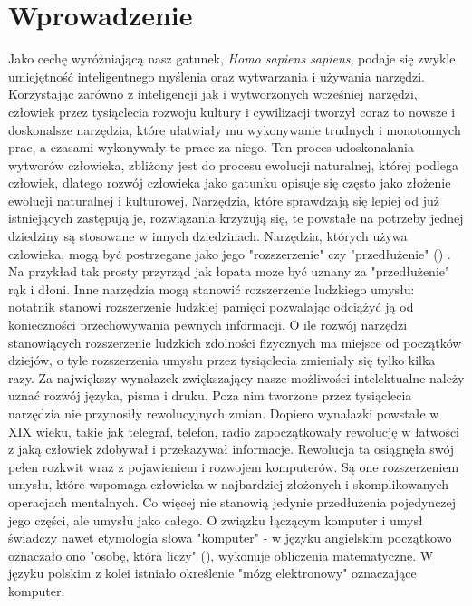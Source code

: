 \chapter{Wprowadzenie}
Jako cechę wyróżniającą nasz gatunek, \textit{Homo sapiens sapiens},  podaje się zwykle umiejętność inteligentnego myślenia oraz wytwarzania i używania narzędzi. Korzystając zarówno z inteligencji jak i wytworzonych wcześniej narzędzi, człowiek przez tysiąclecia rozwoju kultury i cywilizacji tworzył coraz to nowsze i doskonalsze narzędzia, które ułatwiały mu wykonywanie trudnych i monotonnych prac, a czasami wykonywały te prace za niego. Ten proces udoskonalania wytworów człowieka, zbliżony jest do procesu ewolucji naturalnej, której podlega człowiek, dlatego rozwój człowieka jako gatunku opisuje się często jako złożenie ewolucji naturalnej i kulturowej. Narzędzia, które sprawdzają się lepiej od już istniejących zastępują je, rozwiązania krzyżują się, te powstałe na potrzeby jednej dziedziny są stosowane w innych dziedzinach.
Narzędzia, których używa człowieka, mogą być postrzegane jako jego "rozszerzenie" czy "przedłużenie" () \cite{ANAL:ANAL096}. Na przykład tak prosty przyrząd jak łopata może być uznany za "przedłużenie" rąk i dłoni. Inne narzędzia mogą stanowić rozszerzenie ludzkiego umysłu: notatnik stanowi rozszerzenie ludzkiej pamięci pozwalając odciążyć ją od konieczności przechowywania pewnych informacji. O ile rozwój narzędzi stanowiących rozszerzenie ludzkich zdolności fizycznych ma miejsce od początków dziejów, o tyle rozszerzenia umysłu przez tysiąclecia zmieniały się tylko kilka razy. Za największy wynalazek zwiększający nasze możliwości intelektualne należy uznać rozwój języka, pisma i druku. Poza nim tworzone przez tysiąclecia narzędzia nie przynosiły rewolucyjnych zmian. Dopiero wynalazki powstałe w XIX wieku, takie jak telegraf, telefon, radio zapoczątkowały rewolucję w łatwości z jaką człowiek zdobywał i przekazywał informacje. Rewolucja ta osiągnęła swój pełen rozkwit wraz z pojawieniem i rozwojem komputerów. Są one rozszerzeniem umysłu, które wspomaga człowieka w najbardziej złożonych i skomplikowanych operacjach mentalnych. Co więcej nie stanowią jedynie przedłużenia pojedynczej jego części, ale umysłu jako całego. O związku łączącym komputer i umysł świadczy nawet etymologia słowa "komputer" - w języku angielskim początkowo oznaczało ono "osobę, która liczy" (), wykonuje obliczenia matematyczne. W języku polskim z kolei istniało określenie "mózg elektronowy" oznaczające komputer.

